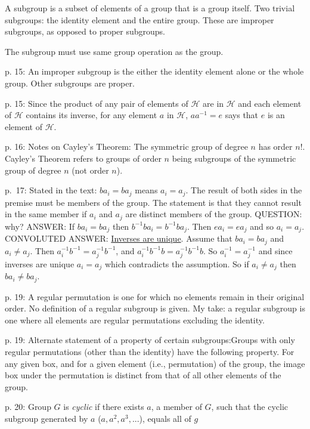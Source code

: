 \documentclass{book}
\begin{document}
A subgroup is a subset of elements of a group that is a group
itself. Two trivial subgroups: the identity element and the entire
group. These are improper subgroups, as opposed to proper subgroups.

The subgroup must use same group operation as the group.

p. 15: An improper subgroup is the either the identity element alone
or the whole group. Other subgroups are proper.

p. 15: Since the product of any pair of elements of $\mathcal H$ are
in $\mathcal H$ and each element of $\mathcal H$ contains its inverse,
for any element $a$ in $\mathcal H$, $aa^{-1} = e$ says that $e$ is an
element of $\mathcal H$.

p. 16: Notes on Cayley's Theorem: The symmetric group of degree $n$
has order $n!$. Cayley's Theorem refers to groups of order $n$ being
subgroups of the symmetric group of degree $n$ (not order $n$).

p.\ 17: Stated in the text: $ba_i = ba_j$ means $a_i = a_j$. The
result of both sides in the premise must be members of the group. The
statement is that they cannot result in the same member if $a_i$ and
$a_j$ are distinct members of the group. QUESTION: why? ANSWER: If
$ba_i = ba_j$ then $b^{-1}ba_i = b^{-1}ba_j$. Then $ea_i = ea_j$ and
so $a_i = a_j$. CONVOLUTED ANSWER:
\href{https://planetmath.org/uniquenessofinverseforgroups}{Inverses
  are unique}. Assume that $ba_i = ba_j$ and $a_i \neq a_j$. Then
$a^{-1}_i b^{-1} = a^{-1}_j b^{-1}$, and $a^{-1}_i b^{-1} b = a^{-1}_j
b^{-1} b$. So $a^{-1}_i = a^{-1}_j$ and since inverses are unique $a_i
= a_j$ which contradicts the assumption. So if $a_i \neq a_j$ then
$ba_i \neq ba_j$.

p. 19: A regular permutation is one for which no elements remain in
their original order. No definition of a regular subgroup is given. My
take: a regular subgroup is one where all elements are regular
permutations excluding the identity.

p. 19: Alternate statement of a property of certain
subgroups:\hfil\break Groups with only regular permutations (other
than the identity) have the following property. For any given box,
and for a given element (i.e., permutation) of the group, the image
box under the permutation is distinct from that of all other elements
of the group.

p. 20: Group $G$ is {\it cyclic} if there exists $a$, a member of $G$,
such that the cyclic subgroup generated by $a$ ($a,a^2,a^3,...$),
equals all of $g$
\end{document}
